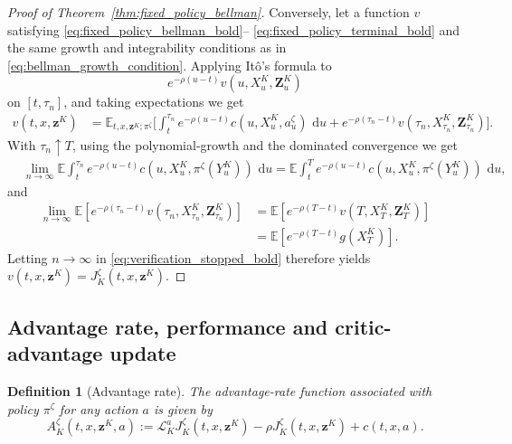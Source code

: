 \documentclass[11pt]{article}
\theoremstyle{remarkitalic}
\newtheorem{definition}[theorem]{Definition}
\theoremstyle{remarkitalic}
\newcommand{\E}{\mathbb E}
\newcommand{\dd}{\,\mathrm d}
\newcommand{\1}{\mathbf 1}
\begin{document}
\begin{proof}[Proof of Theorem~\ref{thm:fixed_policy_bellman}]
Conversely, let a function $v$ satisfying 
\eqref{eq:fixed_policy_bellman_bold}--%
\eqref{eq:fixed_policy_terminal_bold}
and the same growth and integrability conditions as in \eqref{eq:bellman_growth_condition}. Applying
It\^o's formula to
\[
    e^{-\rho(u-t)}
    v\left(
        u,X_u^K,\mathbf Z_u^K
    \right)
\]
on $[t,\tau_n]$, and taking
expectations we get
\begin{align}
    v(t,x,\mathbf z^K)
    &=
    \E_{t,x,\mathbf z^K;\pi^\zeta}
    \Bigg[
        \int_t^{\tau_n}
        e^{-\rho(u-t)}
        c\left(
            u,X_u^K,a_u^\zeta
        \right)
        \,\dd u
        +
        e^{-\rho(\tau_n-t)}
        v\left(
            \tau_n,
            X_{\tau_n}^K,
            \mathbf Z_{\tau_n}^K
        \right)
    \Bigg].
    \label{eq:verification_stopped_bold}
\end{align} With $\tau_n\uparrow T$, using the polynomial-growth and the dominated convergence we get
\begin{align*}
    &\lim_{n\to\infty}
    \E
    \int_t^{\tau_n}
    e^{-\rho(u-t)}
    c\left(
        u,X_u^K,\pi^\zeta(Y_u^K)
    \right)
    \,\dd u
    =
    \E
    \int_t^T
    e^{-\rho(u-t)}
    c\left(
        u,X_u^K,\pi^\zeta(Y_u^K)
    \right)
    \,\dd u,
\end{align*}
and
\begin{align*}
    \lim_{n\to\infty}
    \E
    \left[
        e^{-\rho(\tau_n-t)}
        v\left(
            \tau_n,
            X_{\tau_n}^K,
            \mathbf Z_{\tau_n}^K
        \right)
    \right]
    &=
    \E
    \left[
        e^{-\rho(T-t)}
        v\left(
            T,X_T^K,\mathbf Z_T^K
        \right)
    \right]
    \\
    &
    =
    \E
    \left[
        e^{-\rho(T-t)}
        g\left(
            X_T^K
        \right)
    \right].
\end{align*}
Letting $n\to\infty$ in
\eqref{eq:verification_stopped_bold} therefore yields
$v(t,x,\mathbf z^K)
    =
    J_K^\zeta(t,x,\mathbf z^K).$
\end{proof}

\subsection{Advantage rate, performance and critic-advantage update}

\begin{definition}[Advantage rate]
\label{def:advantage}
The advantage-rate function associated with policy $\pi^\zeta$ for any action $a$ is given by
\[
    A_K^\zeta(t,x,\mathbf z^K,a)
    :=
    \mathcal L_K^a J_K^\zeta(t,x,\mathbf z^K)
    -\rho J_K^\zeta(t,x,\mathbf z^K)
    +c(t,x,a).
\]

\end{definition}
\end{document}
